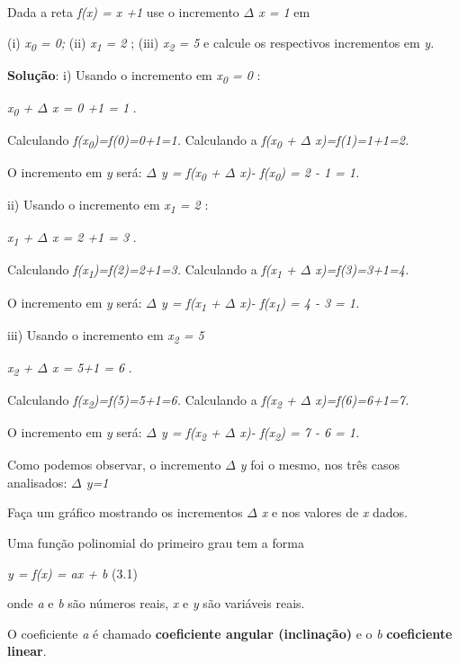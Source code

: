 \begin{texemplo}
Dada a reta \textit{f(x) = x +1 }   use o incremento \textit{$ \Delta $ x = 1 }  em

 (i) \textit{x\textsubscript{0} = 0;   }(ii)\textit{ x\textsubscript{1} = 2}  ; (iii) \textit{x\textsubscript{2} = 5 } e calcule os respectivos incrementos em \textit{y}. 

\textbf{Solução}: i) Usando o incremento em  \textit{x\textsubscript{0} = 0} :  

\textit{ x\textsubscript{0} + $ \Delta $ x = 0 +1  = 1} .  

Calculando  \textit{f(x\textsubscript{0})=f(0)=0+1=1.}   Calculando a\textit{ f(x\textsubscript{0} + $ \Delta $ x)=f(1)=1+1=2.}

O incremento em \textit{y} será:\textit{  $ \Delta $ y =  f(x\textsubscript{0} + $ \Delta $ x)- f(x\textsubscript{0}) =  2 - 1 = 1.}

ii) Usando o incremento em  \textit{x\textsubscript{1} = 2} :  

\textit{x\textsubscript{1} + $ \Delta $ x = 2 +1  = 3} .  

Calculando  \textit{f(x\textsubscript{1})=f(2)=2+1=3.}   Calculando a\textit{ f(x\textsubscript{1} + $ \Delta $ x)=f(3)=3+1=4.}

O incremento em \textit{y} será:\textit{  $ \Delta $ y =  f(x\textsubscript{1} + $ \Delta $ x)- f(x\textsubscript{1}) =  4 - 3 = 1.  }

iii) Usando o incremento em  \textit{x\textsubscript{2} = 5 } 

\textit{x\textsubscript{2} + $ \Delta $ x = 5+1  = 6} .  

Calculando  \textit{f(x\textsubscript{2})=f(5)=5+1=6.}   Calculando a\textit{ f(x\textsubscript{2} + $ \Delta $ x)=f(6)=6+1=7.}

O incremento em \textit{y} será:\textit{  $ \Delta $ y =  f(x\textsubscript{2} + $ \Delta $ x)- f(x\textsubscript{2}) =  7 - 6 = 1.  }

Como podemos observar, o incremento \textit{$ \Delta $ y}  foi o mesmo, nos três casos analisados: \textit{$ \Delta $ y=1}

Faça um gráfico mostrando os incrementos \textit{$ \Delta $ x} e  nos valores de \textit{x} dados.\qedsymbol{}
\end{texemplo}

\begin{caixa}
\begin{tdefinicao}
Uma função polinomial do primeiro grau tem a forma

\textit{y = f(x) = ax + b} \tab (3.1)

onde \textit{a} e \textit{b} são números reais, \textit{x} e \textit{y} são variáveis reais.

O coeficiente \textit{a}  é chamado \textbf{coeficiente angular (inclinação)} e o \textit{b} \textbf{coeficiente linear}.
\end{tdefinicao}
\end{caixa}

